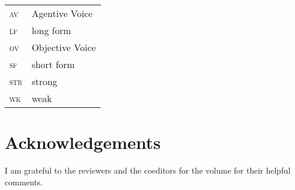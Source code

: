 \documentclass[output=paper
	        ,collection
	        ,collectionchapter
 	        ,biblatex
                ,babelshorthands
                ,newtxmath
                ,draftmode
                ,colorlinks, citecolor=brown
]{langscibook}
\begin{document}
\begin{tabularx}{.45\textwidth}{lX}
\textsc{av} & Agentive Voice\\
\textsc{lf} & long form\\ 
\textsc{ov} & Objective Voice\\
\textsc{sf} & short form\\
\textsc{str} & strong\\
\textsc{wk} & weak\\

\end{tabularx}

\section*{Acknowledgements}

I am grateful to the reviewers and the coeditors for the volume for their helpful comments.
{\sloppy
\printbibliography[heading=subbibliography,notkeyword=this] 
}
\end{document}
